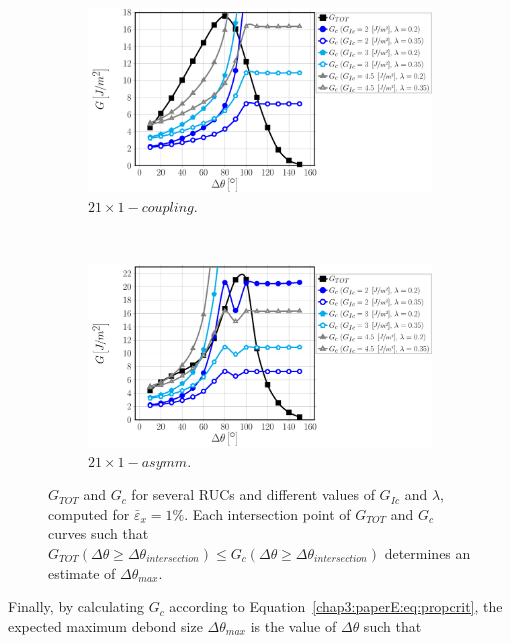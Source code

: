 \begin{figure}[!htbp]
    \begin{subfigure}[b]{0.475\textwidth}
        \includegraphics[width=\textwidth]{paperE/vf60-dsize-S10A0vk.pdf}
        \caption{$21\times 1-coupling$.}\label{chap3:paperE:fig:debondsize-g}
    \end{subfigure} ~
    \begin{subfigure}[b]{0.475\textwidth}
        \includegraphics[width=\textwidth]{paperE/vf60-dsize-S10A0asymm.pdf}
        \caption{$21\times 1-asymm$.}\label{chap3:paperE:fig:debondsize-h}
    \end{subfigure}

\caption{$G_{TOT}$ and $G_{c}$ for several RUCs and different values of $G_{Ic}$ and $\lambda$, computed for $\bar{\varepsilon}_{x}=1\%$. Each intersection point of $G_{TOT}$ and $G_{c}$ curves such that $G_{TOT}\left(\Delta\theta\geq\Delta\theta_{intersection}\right)\leq G_{c}\left(\Delta\theta\geq\Delta\theta_{intersection}\right)$ determines an estimate of $\Delta\theta_{max}$.}\label{chap3:paperE:fig:debondsize}
\end{figure}

Finally, by calculating $G_{c}$ according to Equation~\ref{chap3:paperE:eq:propcrit}, the expected maximum debond size $\Delta\theta_{max}$ is the value of $\Delta\theta$ such that

